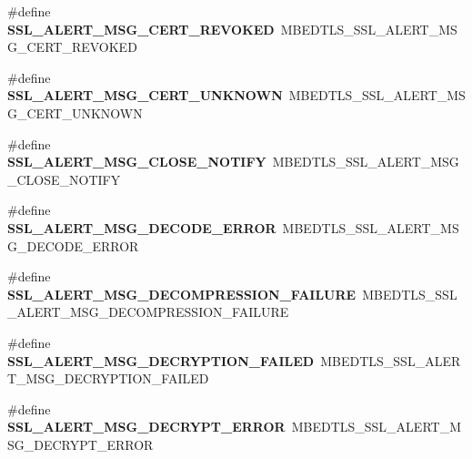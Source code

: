 \begin{DoxyCompactItemize}
\mbox{\label{compat-1_83_8h_aa39fba2c4ce5ed5eef811bbcd331df20}} 
\#define {\bfseries S\+S\+L\+\_\+\+A\+L\+E\+R\+T\+\_\+\+M\+S\+G\+\_\+\+C\+E\+R\+T\+\_\+\+R\+E\+V\+O\+K\+ED}~M\+B\+E\+D\+T\+L\+S\+\_\+\+S\+S\+L\+\_\+\+A\+L\+E\+R\+T\+\_\+\+M\+S\+G\+\_\+\+C\+E\+R\+T\+\_\+\+R\+E\+V\+O\+K\+ED
\item 
\mbox{\label{compat-1_83_8h_a1190be949de654aa59926a1a47722ef0}} 
\#define {\bfseries S\+S\+L\+\_\+\+A\+L\+E\+R\+T\+\_\+\+M\+S\+G\+\_\+\+C\+E\+R\+T\+\_\+\+U\+N\+K\+N\+O\+WN}~M\+B\+E\+D\+T\+L\+S\+\_\+\+S\+S\+L\+\_\+\+A\+L\+E\+R\+T\+\_\+\+M\+S\+G\+\_\+\+C\+E\+R\+T\+\_\+\+U\+N\+K\+N\+O\+WN
\item 
\mbox{\label{compat-1_83_8h_ad14b12418d867f679ae512c85172437d}} 
\#define {\bfseries S\+S\+L\+\_\+\+A\+L\+E\+R\+T\+\_\+\+M\+S\+G\+\_\+\+C\+L\+O\+S\+E\+\_\+\+N\+O\+T\+I\+FY}~M\+B\+E\+D\+T\+L\+S\+\_\+\+S\+S\+L\+\_\+\+A\+L\+E\+R\+T\+\_\+\+M\+S\+G\+\_\+\+C\+L\+O\+S\+E\+\_\+\+N\+O\+T\+I\+FY
\item 
\mbox{\label{compat-1_83_8h_a850d74ffe2fb34a9c8e9502413a50fb6}} 
\#define {\bfseries S\+S\+L\+\_\+\+A\+L\+E\+R\+T\+\_\+\+M\+S\+G\+\_\+\+D\+E\+C\+O\+D\+E\+\_\+\+E\+R\+R\+OR}~M\+B\+E\+D\+T\+L\+S\+\_\+\+S\+S\+L\+\_\+\+A\+L\+E\+R\+T\+\_\+\+M\+S\+G\+\_\+\+D\+E\+C\+O\+D\+E\+\_\+\+E\+R\+R\+OR
\item 
\mbox{\label{compat-1_83_8h_a6d4c809b89c68492e6bff977e580006a}} 
\#define {\bfseries S\+S\+L\+\_\+\+A\+L\+E\+R\+T\+\_\+\+M\+S\+G\+\_\+\+D\+E\+C\+O\+M\+P\+R\+E\+S\+S\+I\+O\+N\+\_\+\+F\+A\+I\+L\+U\+RE}~M\+B\+E\+D\+T\+L\+S\+\_\+\+S\+S\+L\+\_\+\+A\+L\+E\+R\+T\+\_\+\+M\+S\+G\+\_\+\+D\+E\+C\+O\+M\+P\+R\+E\+S\+S\+I\+O\+N\+\_\+\+F\+A\+I\+L\+U\+RE
\item 
\mbox{\label{compat-1_83_8h_a9747c1125f8a52082305522b85553578}} 
\#define {\bfseries S\+S\+L\+\_\+\+A\+L\+E\+R\+T\+\_\+\+M\+S\+G\+\_\+\+D\+E\+C\+R\+Y\+P\+T\+I\+O\+N\+\_\+\+F\+A\+I\+L\+ED}~M\+B\+E\+D\+T\+L\+S\+\_\+\+S\+S\+L\+\_\+\+A\+L\+E\+R\+T\+\_\+\+M\+S\+G\+\_\+\+D\+E\+C\+R\+Y\+P\+T\+I\+O\+N\+\_\+\+F\+A\+I\+L\+ED
\item 
\mbox{\label{compat-1_83_8h_ae944de2c846156585bee4200ef789392}} 
\#define {\bfseries S\+S\+L\+\_\+\+A\+L\+E\+R\+T\+\_\+\+M\+S\+G\+\_\+\+D\+E\+C\+R\+Y\+P\+T\+\_\+\+E\+R\+R\+OR}~M\+B\+E\+D\+T\+L\+S\+\_\+\+S\+S\+L\+\_\+\+A\+L\+E\+R\+T\+\_\+\+M\+S\+G\+\_\+\+D\+E\+C\+R\+Y\+P\+T\+\_\+\+E\+R\+R\+OR

\end{DoxyCompactItemize}
